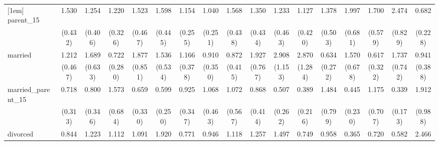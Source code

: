 {\begin{tabular}{l*{16}{c}}
[1em]
parent\_15           &       1.530         &       1.254         &       1.220         &       1.523         &       1.598         &       1.154         &       1.040         &       1.568         &       1.350         &       1.233         &       1.127         &       1.378         &       1.997\sym{*}  &       1.700         &       2.474\sym{**} &       0.682         \\
                    &     (0.432)         &     (0.406)         &     (0.326)         &     (0.467)         &     (0.445)         &     (0.255)         &     (0.251)         &     (0.438)         &     (0.434)         &     (0.463)         &     (0.420)         &     (0.503)         &     (0.681)         &     (0.579)         &     (0.829)         &     (0.228)         \\
[1em]
married             &       1.212         &       1.689         &       0.722         &       1.877         &       1.536         &       1.166         &       0.910         &       0.872         &       1.927         &       2.908\sym{**} &       2.870\sym{*}  &       0.634         &       1.570         &       0.617         &       1.737         &       0.941         \\
                    &     (0.467)         &     (0.633)         &     (0.280)         &     (0.851)         &     (0.534)         &     (0.378)         &     (0.350)         &     (0.415)         &     (0.767)         &     (1.153)         &     (1.284)         &     (0.272)         &     (0.678)         &     (0.322)         &     (0.742)         &     (0.388)         \\
[1em]
married\_parent\_15   &       0.718         &       0.800         &       1.573         &       0.659         &       0.599         &       0.925         &       1.068         &       1.072         &       0.868         &       0.507         &       0.389         &       1.484         &       0.445         &       1.175         &       0.339\sym{*}  &       1.912         \\
                    &     (0.313)         &     (0.346)         &     (0.684)         &     (0.330)         &     (0.250)         &     (0.347)         &     (0.463)         &     (0.567)         &     (0.414)         &     (0.262)         &     (0.216)         &     (0.799)         &     (0.230)         &     (0.707)         &     (0.173)         &     (0.988)         \\
[1em]
divorced            &       0.844         &       1.223         &       1.112         &       1.091         &       1.920         &       0.771         &       0.946         &       1.118         &       1.257         &       1.497         &       0.749         &       0.958         &       0.365\sym{*}  &       0.720         &       0.582         &       2.466\sym{*}  \\

\end{tabular}}
